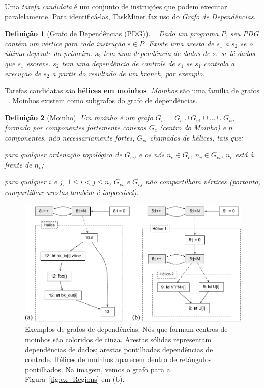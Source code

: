 \documentclass[sigplan,10pt,review]{acmart}
\newcommand\Taskminer{\mbox{\textsf{TaskMiner}}}
\newtheorem{Definicao}{Defini\c{c}\~{a}o}
\begin{document}
Uma {\em tarefa candidata} é um conjunto de instruções que podem executar paralelamente.
Para identificá-las, {\Taskminer} faz uso do {\em Grafo de Dependências}. 

\begin{Definicao} [Grafo de Dependências (PDG)]~\cite{Ferrante87}
\label{def:pdg}
Dado um programa
$P$, seu PDG contém um vértice para cada instrução $s \in P$. Existe uma aresta de 
$s_1$ a $s_2$ se o último depende do primeiro. $s_2$ tem uma dependência de dados de $s_1$
se lê dados que $s_1$ escreve. $s_2$ tem uma dependência de controle de $s_1$ se $s_1$ controla
a execução de $s_2$ a partir do resultado de um \textit{branch}, por exemplo.
\end{Definicao}

Tarefas candidatas são \textbf{hélices em moinhos}. {\em Moinhos} são uma família de grafos ~\cite{Rideau08}.
Moinhos existem como subgrafos do grafo de dependências. 

\begin{Definicao} [Moinho]
\label{def:moinho}
Um moinho é um grafo $G_w = G_c \cup G_{v1} \cup \ldots \cup G_{vn}$
formado por componentes fortemente conexos $G_c$ (centro do Moinho) e $n$ componentes, não necessariamente
fortes, $G_{vi}$ chamados de hélices, tais que:
\begin{compactenum}
\item para qualquer ordenação topológica de $G_w$, e os nós $n_c \in G_c$,
$n_v \in G_{vi}$, $n_c$ está à frente de $n_v$;
\item para qualquer $i$ e $j$, $1 \leq i < j \leq n$, $G_{vi}$ e $G_{vj}$ não
compartilham vértices (portanto, compartilhar arestas também é impossível).
\end{compactenum}
\end{Definicao}

\begin{figure}[h]
\begin{center}
\includegraphics[width=1\columnwidth]{images/ex_windmill}
\caption{Exemplos de grafos de dependências. Nós que formam centros de moinhos
são coloridos de cinza. Arestas sólidas representam dependências de dados; arestas pontilhadas
dependências de controle. Hélices de moinhos aparecem dentro de retângulos pontilhados.
Na imagem, vemos o grafo para a Figura~\ref{fig:ex_Regions} em (b).}
\label{fig:ex_windmill}
\end{center}
\end{figure}
\end{document}
